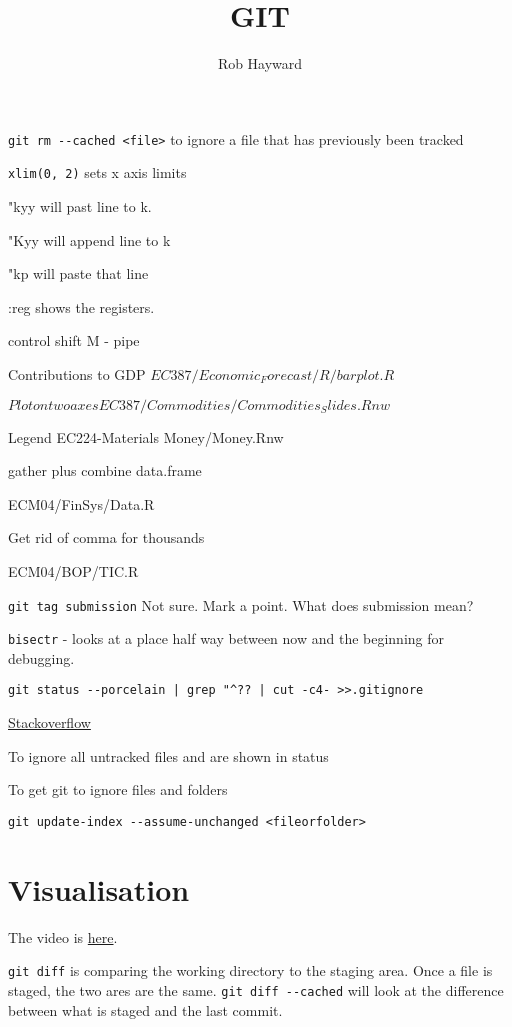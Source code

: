 \documentclass[11pt]{article} %
\title{GIT}
\author{Rob Hayward}
\begin{document}
\maketitle

\lstinline{git rm --cached <file>}  to ignore a file that has previously been tracked

\lstinline{xlim(0, 2)}  sets x axis limits

"kyy will past line to k.  

"Kyy will append line to k

"kp will paste that line

:reg shows the registers. 

control shift M - pipe

Contributions to GDP
$EC387/Economic_Forecast/R/barplot.R$

$Plot on two axes EC387/Commodities/Commodities_Slides.Rnw$

Legend EC224-Materials Money/Money.Rnw

gather plus combine data.frame

ECM04/FinSys/Data.R

Get rid of comma for thousands

ECM04/BOP/TIC.R

\lstinline{git tag submission}  Not sure.  Mark a point. What does submission mean? 

\lstinline{bisectr} - looks at a place half way between now and the beginning for debugging.

\lstinline{git status --porcelain | grep "^?? | cut -c4- >>.gitignore}

\href{http://stackoverflow.com/questions/11542687/git-how-to-ignore-all-present-untracked-files}{Stackoverflow}

To ignore all untracked files and are shown in status

To get git to ignore files and folders

\lstinline{git update-index --assume-unchanged <fileorfolder>}

\section{Visualisation}
The video is \href{https://www.youtube.com/watch?v=sGORc1eOVyE&feature=em-subs_digest}{here}. 

\lstinline{git diff} is comparing the working directory to the staging area. Once a file is staged, the two ares are the same. \lstinline{git diff --cached} will look at the difference between what is staged and the last commit.  
\end{document}
